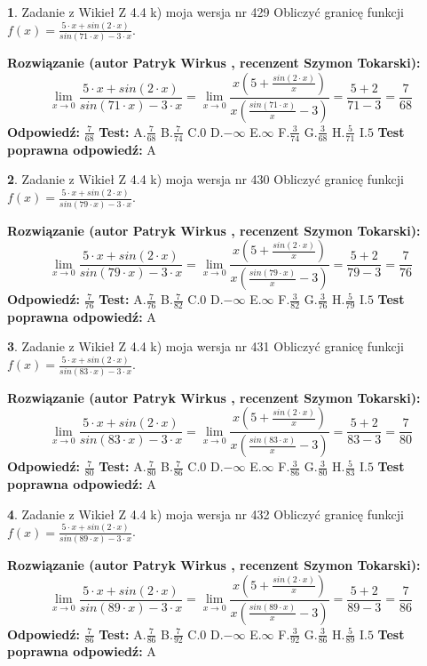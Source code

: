 \documentclass[12pt, a4paper]{article}
\theoremstyle{definition} %
\newtheorem{zad}{}
\newcommand{\zadStart}[1]{\begin{zad}#1\newline}
\newcommand{\zadStop}{\end{zad}}
\newcommand{\rozwStart}[2]{\noindent \textbf{Rozwiązanie (autor #1 , recenzent #2): }\newline}
\newcommand{\rozwStop}{\newline}
\newcommand{\odpStart}{\noindent \textbf{Odpowiedź:}\newline}
\newcommand{\odpStop}{\newline}
\newcommand{\testStart}{\noindent \textbf{Test:}\newline}
\newcommand{\testStop}{\newline}
\newcommand{\kluczStart}{\noindent \textbf{Test poprawna odpowiedź:}\newline}
\newcommand{\kluczStop}{\newline}
\begin{document}
\zadStart{Zadanie z Wikieł Z 4.4 k) moja wersja nr 429}
Obliczyć granicę funkcji $f(x)=\frac{5\cdot x +sin(2\cdot x)}{sin(71\cdot x) -3\cdot x}$.
\zadStop
\rozwStart{Patryk Wirkus}{Szymon Tokarski}
$$\lim\limits_{x\to 0}\frac{5\cdot x +sin(2\cdot x)}{sin(71\cdot x) -3\cdot x}
=\lim\limits_{x\to 0}\frac{x(5+\frac{sin(2\cdot x)}{x})}{x(\frac{sin(71\cdot x)}{x}-3)}
=\frac{5+2}{71-3} = \frac{7}{68}$$
\rozwStop
\odpStart
$\frac{7}{68}$
\odpStop
\testStart
A.$\frac{7}{68}$
B.$\frac{7}{74}$
C.$0$
D.$-\infty$
E.$\infty$
F.$\frac{3}{74}$
G.$\frac{3}{68}$
H.$\frac{5}{71}$
I.$5$
\testStop
\kluczStart
A
\kluczStop



\zadStart{Zadanie z Wikieł Z 4.4 k) moja wersja nr 430}
Obliczyć granicę funkcji $f(x)=\frac{5\cdot x +sin(2\cdot x)}{sin(79\cdot x) -3\cdot x}$.
\zadStop
\rozwStart{Patryk Wirkus}{Szymon Tokarski}
$$\lim\limits_{x\to 0}\frac{5\cdot x +sin(2\cdot x)}{sin(79\cdot x) -3\cdot x}
=\lim\limits_{x\to 0}\frac{x(5+\frac{sin(2\cdot x)}{x})}{x(\frac{sin(79\cdot x)}{x}-3)}
=\frac{5+2}{79-3} = \frac{7}{76}$$
\rozwStop
\odpStart
$\frac{7}{76}$
\odpStop
\testStart
A.$\frac{7}{76}$
B.$\frac{7}{82}$
C.$0$
D.$-\infty$
E.$\infty$
F.$\frac{3}{82}$
G.$\frac{3}{76}$
H.$\frac{5}{79}$
I.$5$
\testStop
\kluczStart
A
\kluczStop



\zadStart{Zadanie z Wikieł Z 4.4 k) moja wersja nr 431}
Obliczyć granicę funkcji $f(x)=\frac{5\cdot x +sin(2\cdot x)}{sin(83\cdot x) -3\cdot x}$.
\zadStop
\rozwStart{Patryk Wirkus}{Szymon Tokarski}
$$\lim\limits_{x\to 0}\frac{5\cdot x +sin(2\cdot x)}{sin(83\cdot x) -3\cdot x}
=\lim\limits_{x\to 0}\frac{x(5+\frac{sin(2\cdot x)}{x})}{x(\frac{sin(83\cdot x)}{x}-3)}
=\frac{5+2}{83-3} = \frac{7}{80}$$
\rozwStop
\odpStart
$\frac{7}{80}$
\odpStop
\testStart
A.$\frac{7}{80}$
B.$\frac{7}{86}$
C.$0$
D.$-\infty$
E.$\infty$
F.$\frac{3}{86}$
G.$\frac{3}{80}$
H.$\frac{5}{83}$
I.$5$
\testStop
\kluczStart
A
\kluczStop



\zadStart{Zadanie z Wikieł Z 4.4 k) moja wersja nr 432}
Obliczyć granicę funkcji $f(x)=\frac{5\cdot x +sin(2\cdot x)}{sin(89\cdot x) -3\cdot x}$.
\zadStop
\rozwStart{Patryk Wirkus}{Szymon Tokarski}
$$\lim\limits_{x\to 0}\frac{5\cdot x +sin(2\cdot x)}{sin(89\cdot x) -3\cdot x}
=\lim\limits_{x\to 0}\frac{x(5+\frac{sin(2\cdot x)}{x})}{x(\frac{sin(89\cdot x)}{x}-3)}
=\frac{5+2}{89-3} = \frac{7}{86}$$
\rozwStop
\odpStart
$\frac{7}{86}$
\odpStop
\testStart
A.$\frac{7}{86}$
B.$\frac{7}{92}$
C.$0$
D.$-\infty$
E.$\infty$
F.$\frac{3}{92}$
G.$\frac{3}{86}$
H.$\frac{5}{89}$
I.$5$
\testStop
\kluczStart
A
\kluczStop
\end{document}
